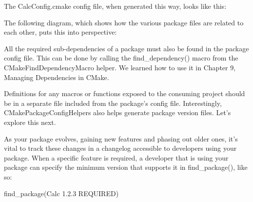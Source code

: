 The CalcConfig.cmake config file, when generated this way, looks like this:


The following diagram, which shows how the various package files are related to each other, puts this into perspective:


All the required sub-dependencies of a package must also be found in the package config file. This can be done by calling the find\_dependency() macro from the CMakeFindDependencyMacro helper. We learned how to use it in Chapter 9, Managing Dependencies in CMake.

Definitions for any macros or functions exposed to the consuming project should be in a separate file included from the package’s config file. Interestingly, CMakePackageConfigHelpers also helps generate package version files. Let’s explore this next.


As your package evolves, gaining new features and phasing out older ones, it’s vital to track these changes in a changelog accessible to developers using your package. When a specific feature is required, a developer that is using your package can specify the minimum version that supports it in find\_package(), like so:

\begin{cmake}
find_package(Calc 1.2.3 REQUIRED)
\end{cmake}

